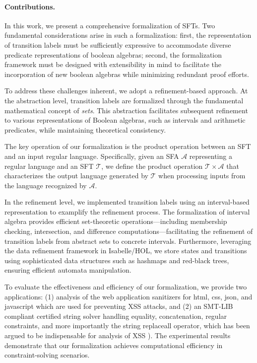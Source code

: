 \paragraph{Contributions.} 
In this work, we present a comprehensive formalization of SFTs. 
Two fundamental considerations arise in such a formalization: first, the 
representation of transition labels must be sufficiently expressive to accommodate diverse predicate representations of boolean algebras; second, the formalization framework must be designed with extensibility in mind to facilitate the incorporation of new boolean algebras while minimizing redundant proof efforts.

To address these challenges inherent, %
we adopt a refinement-based approach. At the abstraction level, transition labels are formalized through the fundamental mathematical concept of \emph{sets}. This abstraction facilitates subsequent refinement to various representations of Boolean algebras, such as intervals and arithmetic predicates, while maintaining theoretical consistency.

The key operation of our formalization is the product operation between an SFT and an input regular language. Specifically, given an SFA $\mathcal{A}$ representing a regular language and an SFT $\mathcal{T}$, we define the product operation $\mathcal{T} \times\mathcal{A}$ that characterizes the output language generated by $\mathcal{T}$ when processing inputs from the language recognized by $\mathcal{A}$.


In the refinement level, we implemented transition labels using an interval-based representation to examplify the refinement process. The formalization of interval algebra provides efficient set-theoretic operations—including membership checking, intersection, and difference computations—facilitating the refinement of transition labels from abstract sets to concrete intervals. Furthermore, leveraging the data refinement framework \cite{DBLP:conf/itp/Lammich13} in Isabelle/HOL, we store states and transitions using sophisticated data structures such as hashmaps and red-black trees, ensuring efficient automata manipulation.

To evaluate the effectiveness and efficiency of our formalization, we 
provide two applications: (1) analysis of the web application sanitizers for html, css, json, and javascript
which are used for preventing XSS attacks, and (2) an SMT-LIB \cite{smtlib}
compliant certified string solver handling equality, concatenation, regular
constraints, and more importantly the string replaceall operator, which has been
argued to be indispensable for analysis of XSS 
\cite{DBLP:conf/popl/LinB16,Kern,Berkeley-JavaScript,DBLP:conf/sp/SaxenaAHMMS10,uss/HooimeijerLMSV11}).
The experimental results demonstrate that our formalization achieves computational efficiency in constraint-solving scenarios.

